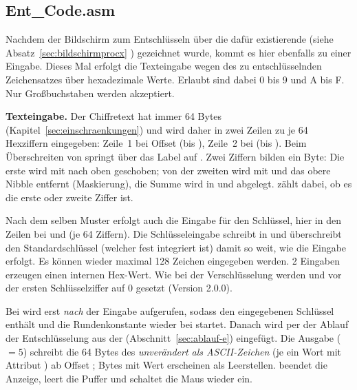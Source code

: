 \subsection{Ent\_Code.asm}
Nachdem der Bildschirm zum Entschlüsseln über die dafür existierende  (siehe Absatz~\ref{sec:bildschirmprocx} ) gezeichnet wurde, kommt es hier ebenfalls zu einer Eingabe. Dieses Mal erfolgt die Texteingabe wegen des zu entschlüsselnden Zeichensatzes über hexadezimale Werte. Erlaubt sind dabei 0 bis 9 und A bis F. Nur Großbuchstaben werden akzeptiert.

\textbf{Texteingabe.} Der Chiffretext hat immer 64 Bytes (Kapitel~\ref{sec:einschraenkungen}) und wird daher in zwei Zeilen zu je 64 Hexziffern eingegeben: Zeile~1 bei Offset  (bis ), Zeile~2 bei  (bis ). Beim Überschreiten von  springt  über das Label  auf . Zwei Ziffern bilden ein Byte: Die erste wird mit  nach oben geschoben; von der zweiten wird mit  und  das obere Nibble entfernt (Maskierung), die Summe  wird in  und  abgelegt.  zählt dabei, ob es die erste oder zweite Ziffer ist.

Nach dem selben Muster erfolgt auch die Eingabe für den Schlüssel, hier in den Zeilen bei  und  (je 64 Ziffern). Die Schlüsseleingabe schreibt in  und überschreibt den Standardschlüssel (welcher fest integriert ist) damit so weit, wie die Eingabe erfolgt. Es können wieder maximal 128 Zeichen eingegeben werden. 2 Eingaben erzeugen einen internen Hex-Wert. Wie bei der Verschlüsselung werden  und  vor der ersten Schlüsselziffer auf 0 gesetzt (Version 2.0.0).

Bei  wird erst \emph{nach} der Eingabe  aufgerufen, sodass  den eingegebenen Schlüssel enthält und die Rundenkonstante wieder bei  startet. Danach wird per  der Ablauf der Entschlüsselung aus der  (Abschnitt~\ref{sec:ablauf-e}) eingefügt. Die Ausgabe ( $=5$) schreibt die 64 Bytes des  \emph{unverändert als ASCII-Zeichen} (je ein Wort mit Attribut ) ab Offset ; Bytes mit Wert  erscheinen als Leerstellen.  beendet die Anzeige,  leert die Puffer und schaltet die Maus wieder ein.

